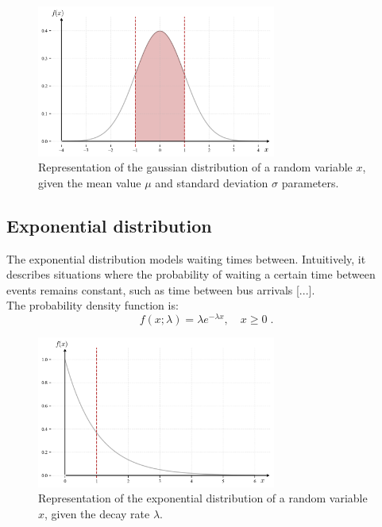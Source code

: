 \documentclass{book}
\begin{document}
\begin{figure}[ht]
    \centering
    \includegraphics[width=0.7\textwidth]{figures/chapter2/gaussian_2.png}
    \caption{Representation of the gaussian distribution of a random variable $x$, given the mean value $\mu$ and standard deviation $\sigma$ parameters.}
    \label{fig:gaussian1}
\end{figure}

\newpage

\subsection{Exponential distribution}
The exponential distribution models waiting times between. Intuitively, it describes situations where the probability of waiting a certain time between events remains constant, such as time between bus arrivals [...].\\

The probability density function is:
\begin{equation}
    f(x; \lambda) = \lambda e^{-\lambda x}, \quad x \geq 0 \; .
\end{equation}

\begin{figure}[ht]
    \centering
    \includegraphics[width=0.7\textwidth]{figures/chapter2/exponential_1.png}
    \caption{Representation of the exponential distribution of a random variable $x$, given the decay rate $\lambda$.}
    \label{fig:exponential1}
\end{figure}
\end{document}

